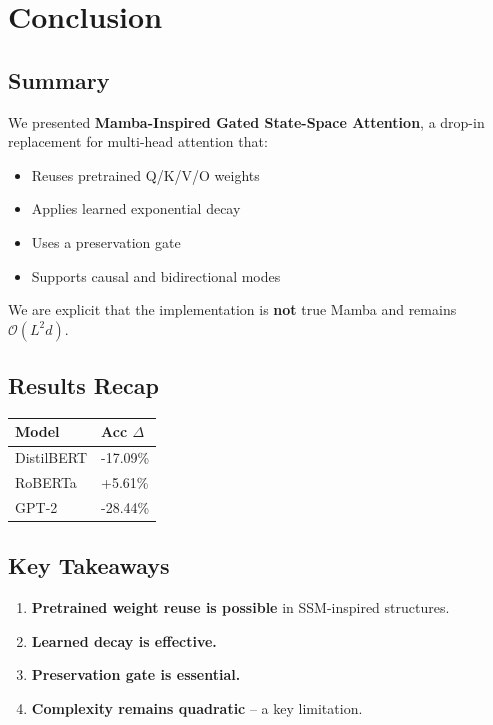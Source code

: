 \section{Conclusion}

\subsection{Summary}

We presented \textbf{Mamba-Inspired Gated State-Space Attention}, a drop-in 
replacement for multi-head attention that:
\begin{itemize}
\item Reuses pretrained Q/K/V/O weights
\item Applies learned exponential decay
\item Uses a preservation gate
\item Supports causal and bidirectional modes

\end{itemize}
We are explicit that the implementation is \textbf{not} true Mamba and remains 
$\mathcal{O}(L^2 d)$.

\subsection{Results Recap}

\begin{table}[H]
\centering
\small
\begin{tabular}{ll}
\toprule
\textbf{Model} & \textbf{Acc $\Delta$} \\
\midrule
DistilBERT & -17.09\% \\
RoBERTa & +5.61\% \\
GPT-2 & -28.44\% \\
\bottomrule
\end{tabular}
\end{table}

\subsection{Key Takeaways}

\begin{enumerate}
\item \textbf{Pretrained weight reuse is possible} in SSM-inspired structures.
\item \textbf{Learned decay is effective.}
\item \textbf{Preservation gate is essential.}
\item \textbf{Complexity remains quadratic} -- a key limitation.

\end{enumerate}
